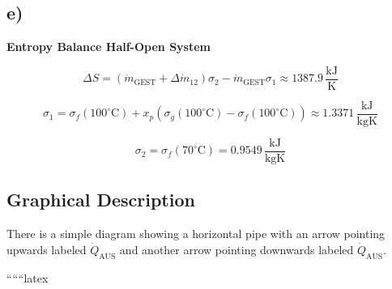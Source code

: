 

\subsection*{e)}
\textbf{Entropy Balance Half-Open System}

\[
\Delta S = \left( \dot{m}_{\text{GEST}} + \Delta \dot{m}_{12} \right) \sigma_2 - \dot{m}_{\text{GEST}} \sigma_1 \approx 1387.9 \, \frac{\text{kJ}}{\text{K}}
\]

\[
\sigma_1 = \sigma_f(100^\circ \text{C}) + x_p \left( \sigma_g(100^\circ \text{C}) - \sigma_f(100^\circ \text{C}) \right) \approx 1.3371 \, \frac{\text{kJ}}{\text{kgK}}
\]

\[
\sigma_2 = \sigma_f(70^\circ \text{C}) = 0.9549 \, \frac{\text{kJ}}{\text{kgK}}
\]

\subsection*{Graphical Description}
There is a simple diagram showing a horizontal pipe with an arrow pointing upwards labeled $\dot{Q}_{\text{AUS}}$ and another arrow pointing downwards labeled $\dot{Q}_{\text{AUS}}$.

``````latex
